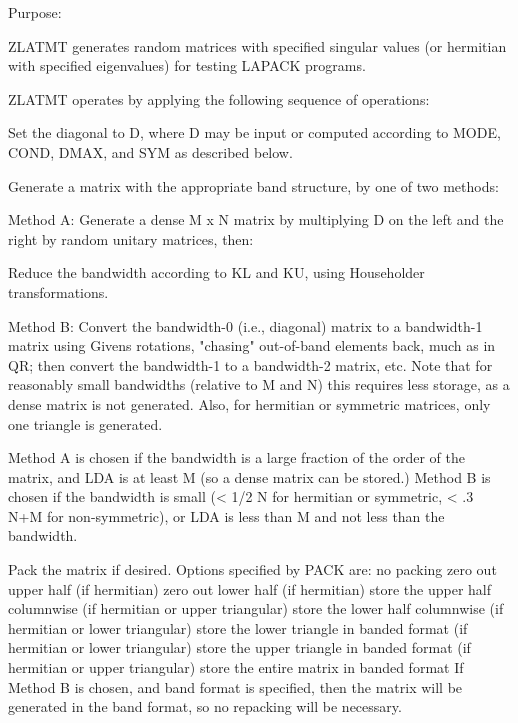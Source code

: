 \begin{DoxyParagraph}{Purpose\+: }
\begin{DoxyVerb}    ZLATMT generates random matrices with specified singular values
    (or hermitian with specified eigenvalues)
    for testing LAPACK programs.

    ZLATMT operates by applying the following sequence of
    operations:

      Set the diagonal to D, where D may be input or
         computed according to MODE, COND, DMAX, and SYM
         as described below.

      Generate a matrix with the appropriate band structure, by one
         of two methods:

      Method A:
          Generate a dense M x N matrix by multiplying D on the left
              and the right by random unitary matrices, then:

          Reduce the bandwidth according to KL and KU, using
              Householder transformations.

      Method B:
          Convert the bandwidth-0 (i.e., diagonal) matrix to a
              bandwidth-1 matrix using Givens rotations, "chasing"
              out-of-band elements back, much as in QR; then convert
              the bandwidth-1 to a bandwidth-2 matrix, etc.  Note
              that for reasonably small bandwidths (relative to M and
              N) this requires less storage, as a dense matrix is not
              generated.  Also, for hermitian or symmetric matrices,
              only one triangle is generated.

      Method A is chosen if the bandwidth is a large fraction of the
          order of the matrix, and LDA is at least M (so a dense
          matrix can be stored.)  Method B is chosen if the bandwidth
          is small (< 1/2 N for hermitian or symmetric, < .3 N+M for
          non-symmetric), or LDA is less than M and not less than the
          bandwidth.

      Pack the matrix if desired. Options specified by PACK are:
         no packing
         zero out upper half (if hermitian)
         zero out lower half (if hermitian)
         store the upper half columnwise (if hermitian or upper
               triangular)
         store the lower half columnwise (if hermitian or lower
               triangular)
         store the lower triangle in banded format (if hermitian or
               lower triangular)
         store the upper triangle in banded format (if hermitian or
               upper triangular)
         store the entire matrix in banded format
      If Method B is chosen, and band format is specified, then the
         matrix will be generated in the band format, so no repacking
         will be necessary.\end{DoxyVerb}
 
\end{DoxyParagraph}

